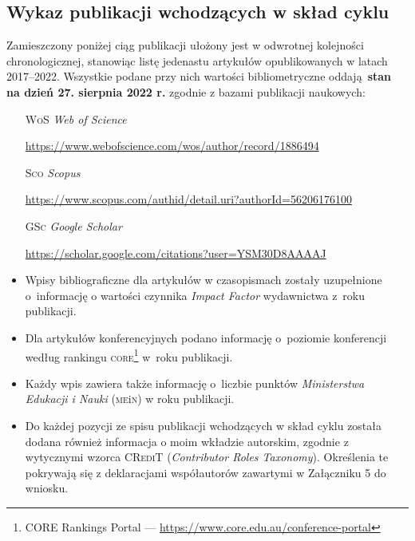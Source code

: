 
\begin{fullwidth}
\subsection{Wykaz publikacji wchodzących w skład cyklu}


Zamieszczony poniżej ciąg publikacji ułożony jest w odwrotnej kolejności chronologicznej, stanowiąc listę jedenastu artykułów opublikowanych w latach 2017--2022. Wszystkie podane przy nich wartości bibliometryczne oddają \textbf{stan na dzień 27. sierpnia 2022 r.} zgodnie z bazami publikacji naukowych:
\end{fullwidth}

\begin{itemize}
	\item[\textsc{WoS}] \emph{Web of Science}%
	
	\url{https://www.webofscience.com/wos/author/record/1886494}	
	
	\item[\textsc{Sco}] \emph{Scopus}%
	
	\url{https://www.scopus.com/authid/detail.uri?authorId=56206176100}
	
	\item[\textsc{GSc}] \emph{Google Scholar}%
	
	\url{https://scholar.google.com/citations?user=YSM30D8AAAAJ}
	\vfill
	
	\item Wpisy bibliograficzne dla artykułów w czasopismach zostały uzupełnione o~informację o wartości czynnika \emph{Impact Factor} wydawnictwa z~roku publikacji.
	\item Dla artykułów konferencyjnych podano informację o~poziomie konferencji według rankingu \textsc{core}\footnote{CORE Rankings Portal --- \url{https://www.core.edu.au/conference-portal}} w~roku publikacji. 
	\item Każdy wpis zawiera także informację o~liczbie punktów \emph{Ministerstwa Edukacji i Nauki} (\textsc{me}i\textsc{n}) w roku publikacji.
	\item Do każdej pozycji ze spisu publikacji wchodzących w skład cyklu została dodana również informacja o moim wkładzie autorskim, zgodnie z wytycznymi wzorca \textsc{CRediT} (\emph{Contributor Roles Taxonomy}). Określenia te pokrywają się z deklaracjami współautorów zawartymi w Załączniku 5 do wniosku.
\end{itemize}

